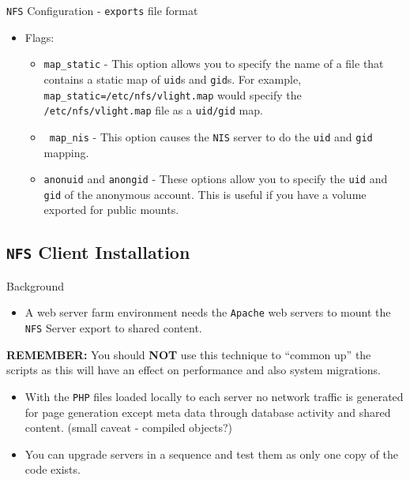 \documentclass[xcolor=table]{beamer}
\begin{document}
\begin{frame}{\texttt{NFS} Configuration - \texttt{exports} file format}
  \begin{itemize}
    \item Flags:
      \begin{itemize}
        \item \texttt{map\_static} - This option allows you to specify the name of a file that contains a static map of \texttt{uid}s and \texttt{gid}s. For example, \texttt{map\_static=/etc/nfs/vlight.map} would specify the \texttt{/etc/nfs/vlight.map} file as a \texttt{uid/gid} map. 
        \item \texttt{ map\_nis} - This option causes the \texttt{NIS} server to do the \texttt{uid} and \texttt{gid} mapping.
        \item \texttt{anonuid} and \texttt{anongid} - These options allow you to specify the \texttt{uid} and \texttt{gid} of the anonymous account. This is useful if you have a volume exported for public mounts.
      \end{itemize}
  \end{itemize}
\end{frame}

\subsection{\texttt{NFS} Client Installation}
\begin{frame}{Background}
  \begin{itemize}
    \item A web server farm environment needs the \texttt{Apache} web servers to mount the \texttt{NFS} Server export to shared content.
  \end{itemize}
  \begin{tcolorbox}
      \noindent \scriptsize \textbf{REMEMBER:} You should \textbf{NOT} use this technique to ``common up'' the scripts as this will have an effect on performance and also system migrations.
      \begin{itemize}
        \item With the \texttt{PHP} files loaded locally to each server no network traffic is generated for page generation except meta data through database activity and shared content. (small caveat - compiled objects?)
        \item You can upgrade servers in a sequence and test them as only one copy of the code exists.
      \end{itemize}
  \end{tcolorbox}
\end{frame}
\end{document}
